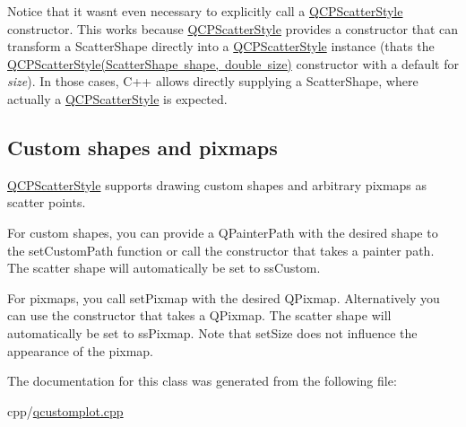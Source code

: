 \begin{DoxyCodeInclude}
\end{DoxyCodeInclude}
 Notice that it wasn\textquotesingle{}t even necessary to explicitly call a \mbox{\hyperlink{class_q_c_p_scatter_style}{Q\+C\+P\+Scatter\+Style}} constructor. This works because \mbox{\hyperlink{class_q_c_p_scatter_style}{Q\+C\+P\+Scatter\+Style}} provides a constructor that can transform a Scatter\+Shape directly into a \mbox{\hyperlink{class_q_c_p_scatter_style}{Q\+C\+P\+Scatter\+Style}} instance (that\textquotesingle{}s the \mbox{\hyperlink{class_q_c_p_scatter_style}{Q\+C\+P\+Scatter\+Style(\+Scatter\+Shape shape, double size)}} constructor with a default for {\itshape size}). In those cases, C++ allows directly supplying a Scatter\+Shape, where actually a \mbox{\hyperlink{class_q_c_p_scatter_style}{Q\+C\+P\+Scatter\+Style}} is expected.\hypertarget{class_q_c_p_scatter_style_QCPScatterStyle-custompath-and-pixmap}{}\subsection{Custom shapes and pixmaps}\label{class_q_c_p_scatter_style_QCPScatterStyle-custompath-and-pixmap}
\mbox{\hyperlink{class_q_c_p_scatter_style}{Q\+C\+P\+Scatter\+Style}} supports drawing custom shapes and arbitrary pixmaps as scatter points.

For custom shapes, you can provide a Q\+Painter\+Path with the desired shape to the set\+Custom\+Path function or call the constructor that takes a painter path. The scatter shape will automatically be set to ss\+Custom.

For pixmaps, you call set\+Pixmap with the desired Q\+Pixmap. Alternatively you can use the constructor that takes a Q\+Pixmap. The scatter shape will automatically be set to ss\+Pixmap. Note that set\+Size does not influence the appearance of the pixmap. 

The documentation for this class was generated from the following file\+:\begin{DoxyCompactItemize}
\item 
cpp/\mbox{\hyperlink{qcustomplot_8cpp}{qcustomplot.\+cpp}}\end{DoxyCompactItemize}
